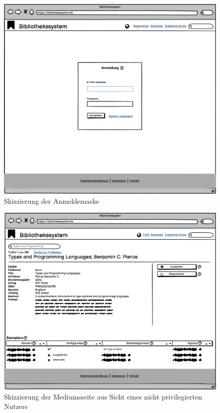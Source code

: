 \documentclass{article}
\begin{document}
\begin{figure}[h]
    \includegraphics[width = 40em]{Anmeldemaske}
    \caption{Skizzierung der Anmeldemaske}
    \label{anmeldemaske}
\end{figure}

\begin{figure}[h]
    \includegraphics[width = 40em]{Mediumsseite}
    \caption{Skizzierung der Mediumsseite aus Sicht eines nicht privilegierten Nutzers}
    \label{mediumsseite_angemeldet}
\end{figure}
\end{document}
